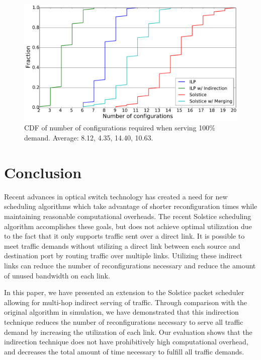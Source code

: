 \begin{figure}[t]
    \center
    \includegraphics[width=5in]{conf.pdf}
    \caption{\label{fig:conf}CDF of number of configurations required when serving 100\% demand. Average: 8.12, 4.35, 14.40, 10.63.}
\end{figure}

\section{Conclusion}
\label{sec:conclu}

Recent advances in optical switch technology has created a need for new scheduling
algorithms which take advantage of shorter reconfiguration times while maintaining
reasonable computational overheads. The recent Solstice scheduling algorithm
accomplishes these goals, but does not achieve optimal utilization due to the
fact that it only supports traffic sent over a direct link.
It is possible to meet traffic demands without utilizing a direct link between
each source and destination port by routing traffic over multiple links.
Utilizing these indirect links can reduce the number of reconfigurations necessary
and reduce the amount of unused bandwidth on each link.

In this paper, we have presented an extension to the Solstice packet scheduler allowing for
multi-hop indirect serving of traffic. Through comparison with the original
algorithm in simulation, we have demonstrated that
this indirection technique reduces the number of reconfigurations necessary to serve
all traffic demand by increasing the utilization of each link. 
Our evaluation shows that the indirection technique does not have prohibitively high
computational overhead, and decreases the total amount of time necessary to fulfill
all traffic demands. 
